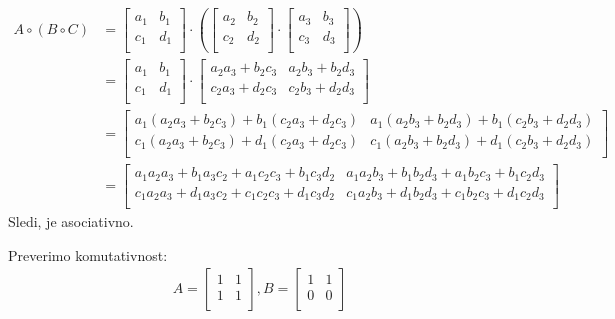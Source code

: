 \documentclass[12pt]{article}
\begin{document}
\begin{align*}
    A \circ (B \circ C) 
    &=
    \begin{bmatrix}
        a_1 & b_1 \\
        c_1 & d_1 \\
    \end{bmatrix} 
    \cdot 
    \left(
        \begin{bmatrix}
            a_2 & b_2 \\
            c_2 & d_2 \\
        \end{bmatrix} 
        \cdot
        \begin{bmatrix}
            a_3 & b_3 \\
            c_3 & d_3 \\
        \end{bmatrix} 
    \right)
    \\[1em]
    &=
    \begin{bmatrix}
        a_1 & b_1 \\
        c_1 & d_1 \\
    \end{bmatrix} 
    \cdot 
    \begin{bmatrix}
        a_2a_3+b_2c_3 & a_2b_3+b_2d_3 \\
        c_2a_3 + d_2c_3 & c_2b_3+d_2d_3 \\
    \end{bmatrix}
    \\[1em]
    &=
    \begin{bmatrix}
        a_1(a_2a_3+b_2c_3) + b_1(c_2a_3 + d_2c_3) & a_1(a_2b_3+b_2d_3) + b_1(c_2b_3+d_2d_3) \\
        c_1(a_2a_3+b_2c_3) + d_1(c_2a_3 + d_2c_3) & c_1(a_2b_3+b_2d_3) + d_1(c_2b_3+d_2d_3) \\
    \end{bmatrix}
    \\[1em]
    &=
    \begin{bmatrix}
        a_1a_2a_3 + b_1a_3c_2 + a_1c_2c_3 + b_1c_3d_2 & a_1a_2b_3 + b_1b_2d_3 + a_1b_2c_3 + b_1c_2d_3 \\
        c_1a_2a_3 + d_1a_3c_2 + c_1c_2c_3 + d_1c_3d_2 & c_1a_2b_3 + d_1b_2d_3 + c_1b_2c_3 + d_1c_2d_3 \\
    \end{bmatrix}
\end{align*}
\hspace*{1em} Sledi, je asociativno.

\noindent
\hspace*{1em} Preverimo komutativnost: \\
\begin{align*}
    A = 
    \begin{bmatrix}
        1 & 1 \\
        1 & 1 \\
    \end{bmatrix}, 
    B = 
    \begin{bmatrix}
        1 & 1 \\
        0 & 0 \\
    \end{bmatrix}
\end{align*}
\end{document}
